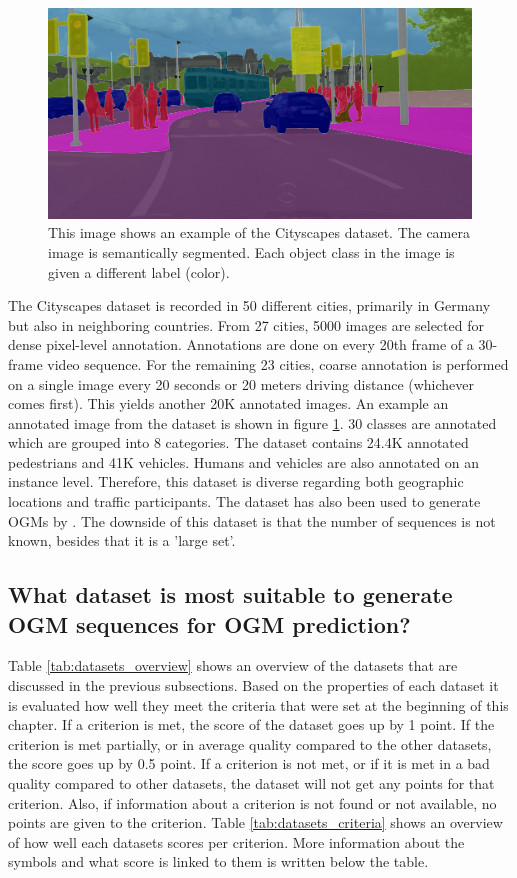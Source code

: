 \begin{figure}[h!]
	\centering
	\includegraphics[width=0.6\linewidth]{Figures/Datasets/Cityscapes_Dataset}
	\caption{This image shows an example of the Cityscapes \cite{cordts2016cityscapes} dataset. The camera image is semantically segmented. Each object class in the image is given a different label (color).}  
	\label{fig:dat_cityscapes}
\end{figure}

The Cityscapes dataset \cite{cordts2016cityscapes} is recorded in 50 different cities, primarily in Germany but also in neighboring countries. From 27 cities, 5000 images are selected for dense pixel-level annotation. Annotations are done on every 20th frame of a 30-frame video sequence. For the remaining 23 cities, coarse annotation is performed on a single image every 20 seconds or 20 meters driving distance (whichever comes first). This yields another 20K annotated images. An example an annotated image from the dataset is shown in figure \ref{fig:dat_cityscapes}. 30 classes are annotated which are grouped into 8 categories. The dataset contains 24.4K annotated pedestrians and 41K vehicles. Humans and vehicles are also annotated on an instance level. Therefore, this dataset is diverse regarding both geographic locations and traffic participants. The dataset has also been used to generate \glspl{OGM} by \cite{hehn2021fast}. The downside of this dataset is that the number of sequences is not known, besides that it is a 'large set'. 

\subsection{What dataset is most suitable to generate \gls{OGM} sequences for \gls{OGM} prediction?} \label{subsec:data_con}

Table \ref{tab:datasets_overview} shows an overview of the datasets that are discussed in the previous subsections. Based on the properties of each dataset it is evaluated how well they meet the criteria that were set at the beginning of this chapter. If a criterion is met, the score of the dataset goes up by 1 point. If the criterion is met partially, or in average quality compared to the other datasets, the score goes up by 0.5 point. If a criterion is not met, or if it is met in a bad quality compared to other datasets, the dataset will not get any points for that criterion. Also, if information about a criterion is not found or not available, no points are given to the criterion. Table \ref{tab:datasets_criteria} shows an overview of how well each datasets scores per criterion. More information about the symbols and what score is linked to them is written below the table. \\

